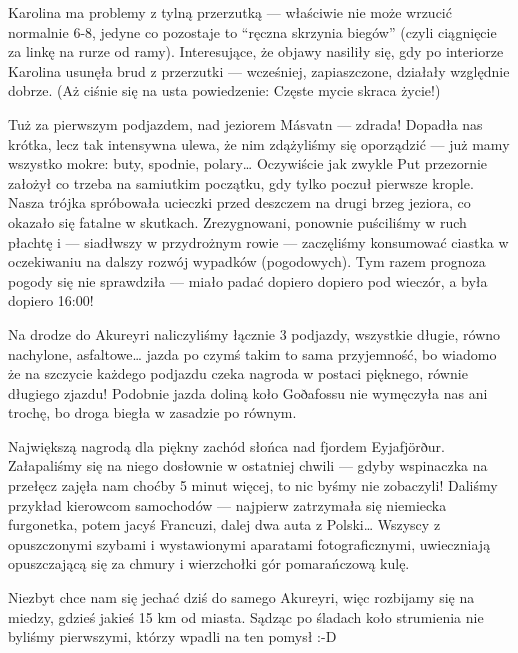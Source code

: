 
Karolina ma problemy z tylną przerzutką --- właściwie nie może wrzucić normalnie 6-8, jedyne co pozostaje to “ręczna skrzynia biegów” (czyli ciągnięcie za linkę na rurze od ramy). Interesujące, że objawy nasiliły się, gdy po interiorze Karolina usunęła brud z przerzutki --- wcześniej, zapiaszczone, działały względnie dobrze. (Aż ciśnie się na usta powiedzenie: Częste mycie skraca życie!)

Tuż za pierwszym podjazdem, nad jeziorem Másvatn --- zdrada! Dopadła nas krótka, lecz tak intensywna ulewa, że nim zdążyliśmy się oporządzić --- już mamy wszystko mokre: buty, spodnie, polary… Oczywiście jak zwykle Put przezornie założył co trzeba na samiutkim początku, gdy tylko poczuł pierwsze krople. Nasza trójka spróbowała ucieczki przed deszczem na drugi brzeg jeziora, co okazało się  fatalne w skutkach. Zrezygnowani, ponownie puściliśmy w ruch płachtę i --- siadłwszy w przydrożnym rowie --- zaczęliśmy konsumować ciastka w oczekiwaniu na dalszy rozwój wypadków (pogodowych). Tym razem prognoza pogody się nie sprawdziła --- miało padać dopiero dopiero pod wieczór, a była dopiero 16:00!

Na drodze do Akureyri naliczyliśmy łącznie 3 podjazdy, wszystkie długie, równo nachylone, asfaltowe… jazda po czymś takim to sama przyjemność, bo wiadomo że na szczycie każdego podjazdu czeka nagroda w postaci pięknego, równie długiego zjazdu! Podobnie jazda doliną koło Goðafossu nie wymęczyła nas ani trochę, bo droga biegła w zasadzie po równym.

Największą nagrodą dla piękny zachód słońca nad fjordem Eyjafjörður. Załapaliśmy się na niego dosłownie w ostatniej chwili --- gdyby wspinaczka na przełęcz zajęła nam choćby 5 minut więcej, to nic byśmy nie zobaczyli! Daliśmy przykład kierowcom samochodów --- najpierw zatrzymała się niemiecka furgonetka, potem jacyś Francuzi, dalej dwa auta z Polski… Wszyscy z opuszczonymi szybami i wystawionymi aparatami fotograficznymi, uwieczniają opuszczającą się za chmury i wierzchołki gór pomarańczową kulę.


Niezbyt chce nam się jechać dziś do samego Akureyri, więc rozbijamy się na miedzy, gdzieś jakieś 15 km od miasta. Sądząc po śladach koło strumienia nie byliśmy pierwszymi, którzy wpadli na ten pomysł :-D

